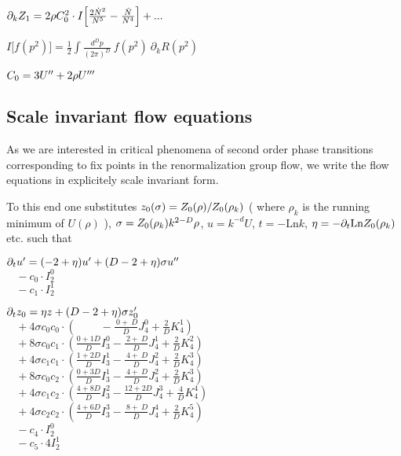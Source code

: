 \documentclass[a4paper,aps,prl,twocolumn,groupedaddress]{revtex4}
\begin{document}
\smallskip $ \partial_k Z_1 = 2 \rho C_0^2 \cdot I\Big[ \frac{2\dot{N}^2}{N^5} - \frac{\ddot{N}}{N^4} \Big] + ... $

\bigskip $ I\Big[f(p^2)\Big] = \frac{1}{2} \int \frac{d^Dp}{(2\pi)^D} ~ f(p^2) ~ \partial_k R(p^2) $

\smallskip $ C_0 = 3U^{\prime\prime}+2\rho U^{\prime\prime\prime} $





\newpage
\subsection*{Scale invariant flow equations}

\noindent
As we are interested in critical phenomena of second order phase transitions 
corresponding to fix points in the renormalization group flow, we write the
flow equations in explicitely scale invariant form.

\bigskip
\noindent
To this end one substitutes $ z_0(\sigma) = Z_0(\rho) / Z_0(\rho_k) $ ( where
$\rho_k$ is the running minimum of $U(\rho)$ ), $\sigma=Z_0(\rho_k)k^{2-D}\rho$,
$ u = k^{-d} U $, $t=-\textrm{Ln}k$, $\eta=-\partial_t \textrm{Ln}Z_0(\rho_k)$ etc.
such that

\bigskip $ \partial_t u^\prime = (-2+\eta) u^\prime +(D-2+\eta)\sigma u^{\prime\prime} $\\
$ ~~~~ - c_0 \cdot I_2^0 $\\
$ ~~~~ - c_1 \cdot I_2^1 $

\bigskip $ \partial_t z_0 = \eta z + (D-2+\eta) \sigma {z_0^\prime} $\\
$ ~~~~ + 4 \sigma c_0 c_0 \cdot ( ~~~~~~~~~~           - \frac{~0+~D}{D} J_4^0 + \frac{2}{D} K_4^1 ) $\\
$ ~~~~ + 8 \sigma c_0 c_1 \cdot ( \frac{0+1D}{D} I_3^0 - \frac{~2+~D}{D} J_4^1 + \frac{2}{D} K_4^2 ) $\\
$ ~~~~ + 4 \sigma c_1 c_1 \cdot ( \frac{1+2D}{D} I_3^1 - \frac{~4+~D}{D} J_4^2 + \frac{2}{D} K_4^3 ) $\\
$ ~~~~ + 8 \sigma c_0 c_2 \cdot ( \frac{0+3D}{D} I_3^1 - \frac{~4+~D}{D} J_4^2 + \frac{2}{D} K_4^3 ) $\\
$ ~~~~ + 4 \sigma c_1 c_2 \cdot ( \frac{4+8D}{D} I_3^2 - \frac{12+2D}{D} J_4^3 + \frac{4}{D} K_4^4 ) $\\
$ ~~~~ + 4 \sigma c_2 c_2 \cdot ( \frac{4+6D}{D} I_3^3 - \frac{~8+~D}{D} J_4^4 + \frac{2}{D} K_4^5 ) $\\
$ ~~~~ - c_4 \cdot I_2^0 $\\
$ ~~~~ - c_5 \cdot 4 I_2^1 $
\end{document}
